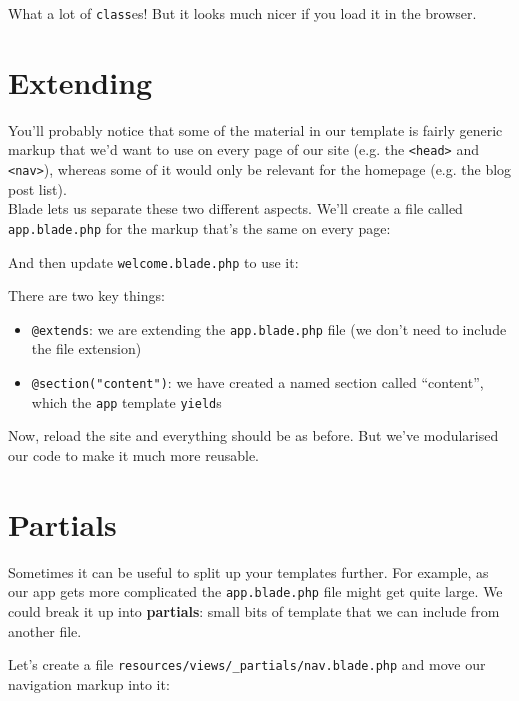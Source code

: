 What a lot of \texttt{class}es! But it looks much nicer if you load it in the browser.



\section{Extending}

You'll probably notice that some of the material in our template is fairly generic markup that we'd want to use on every page of our site (e.g. the \texttt{<head>} and \texttt{<nav>}), whereas some of it would only be relevant for the homepage (e.g. the blog post list).
\\

Blade lets us separate these two different aspects. We'll create a file called \texttt{app.blade.php} for the markup that's the same on every page:


And then update \texttt{welcome.blade.php} to use it:


There are two key things:

\begin{itemize}
    \item \texttt{@extends}: we are extending the \texttt{app.blade.php} file (we don't need to include the file extension)
    \item \texttt{@section("content")}: we have created a named section called ``content'', which the \texttt{app} template \texttt{yield}s
\end{itemize}

Now, reload the site and everything should be as before. But we've modularised our code to make it much more reusable.


\section{Partials}

Sometimes it can be useful to split up your templates further. For example, as our app gets more complicated the \texttt{app.blade.php} file might get quite large. We could break it up into \textbf{partials}: small bits of template that we can include from another file.

\pagebreak

Let's create a file \texttt{resources/views/_partials/nav.blade.php} and move our navigation markup into it:

